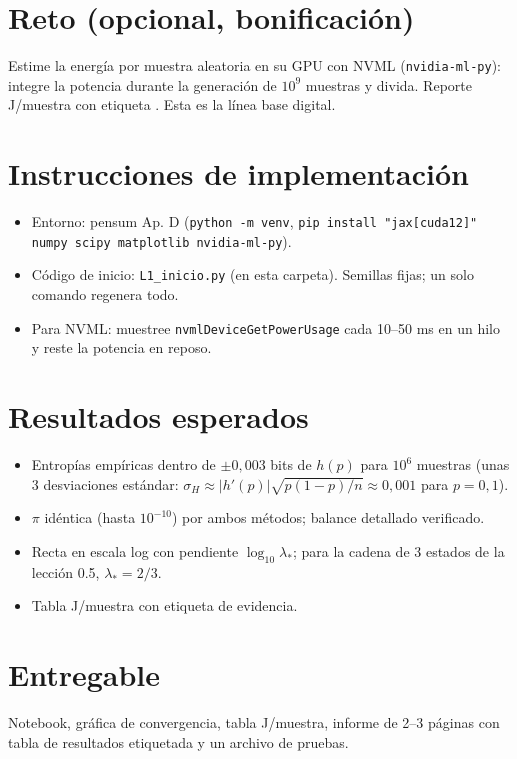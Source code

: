 \documentclass[11pt,a4paper]{article}
\begin{document}
\section*{Reto (opcional, bonificación)}
Estime la energía por muestra aleatoria en su GPU con NVML (\texttt{nvidia-ml-py}): integre la potencia durante la
generación de $10^9$ muestras y divida. Reporte J/muestra con etiqueta \evM. Esta es la línea base digital.

\section*{Instrucciones de implementación}
\begin{itemize}[nosep]
\item Entorno: pensum Ap. D (\texttt{python -m venv}, \texttt{pip install "jax[cuda12]" numpy scipy matplotlib nvidia-ml-py}).
\item Código de inicio: \texttt{L1\_inicio.py} (en esta carpeta). Semillas fijas; un solo comando regenera todo.
\item Para NVML: muestree \texttt{nvmlDeviceGetPowerUsage} cada 10--50 ms en un hilo y reste la potencia en reposo.
\end{itemize}

\section*{Resultados esperados}
\begin{itemize}[nosep]
\item Entropías empíricas dentro de $\pm0{,}003$ bits de $h(p)$ para $10^6$ muestras (unas 3 desviaciones estándar: $\sigma_H\approx|h'(p)|\sqrt{p(1-p)/n}\approx0{,}001$ para $p=0{,}1$).
\item $\pi$ idéntica (hasta $10^{-10}$) por ambos métodos; balance detallado verificado.
\item Recta en escala log con pendiente $\log_{10}\lambda_*$; para la cadena de 3 estados de la lección 0.5, $\lambda_*=2/3$.
\item Tabla J/muestra con etiqueta de evidencia.
\end{itemize}

\section*{Entregable}
Notebook, gráfica de convergencia, tabla J/muestra, informe de 2--3 páginas con tabla de resultados etiquetada y un archivo de pruebas.
\end{document}
